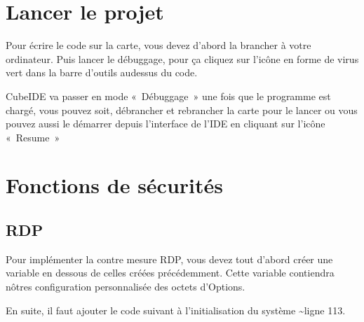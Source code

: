 \documentclass[letterpaper,10pt,french]{sphinxmanual}
\begin{document}
\section{Lancer le projet}
\label{\detokenize{creationPrgpourFctdeSEc:lancer-le-projet}}
Pour écrire le code sur la carte, vous devez d’abord la brancher à votre ordinateur.
Puis lancer le débuggage, pour ça cliquez sur l’icône en forme de virus vert dans la barre d’outils au\sphinxhyphen{}dessus du code.


CubeIDE va passer en mode « Débuggage » une fois que le programme est chargé, vous pouvez soit, débrancher et rebrancher la carte pour le lancer ou vous pouvez aussi le démarrer depuis l’interface de l’IDE en cliquant sur l’icône « Resume »



\section{Fonctions de sécurités}
\label{\detokenize{creationPrgpourFctdeSEc:fonctions-de-securites}}

\subsection{RDP}
\label{\detokenize{creationPrgpourFctdeSEc:rdp}}
Pour implémenter la contre mesure RDP, vous devez tout d’abord créer une variable en dessous de celles créées précédemment.
Cette variable contiendra nôtres configuration personnalisée des octets d’Options.

\begin{sphinxVerbatim}[commandchars=\\\{\}]
       
\end{sphinxVerbatim}

En suite, il faut ajouter le code suivant à l’initialisation du système \textasciitilde{}ligne 113.
\end{document}
